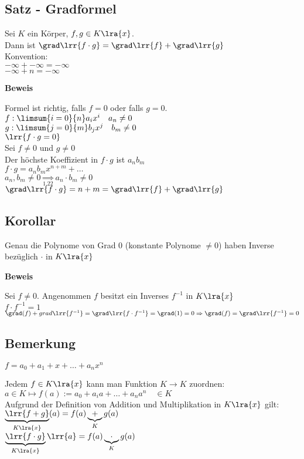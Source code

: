 \subsection{Satz - Gradformel}
	Sei $K$ ein Körper, $f,g\in K\lra{x}$.\\
	Dann ist $\grad\lrr{f\cdot g}=\grad\lrr{f}+\grad\lrr{g}$\\
	Konvention:\\
	$-\infty+-\infty=-\infty$\\
	$-\infty+n=-\infty$
	
	\textbf{Beweis}
	
	Formel ist richtig, falls $f=0$ oder falls $g=0$.\\
	$f:\limsum{i=0}{n}a_ix^i\quad a_n\neq 0$\\
	$g:\limsum{j=0}{m}b_jx^j\quad b_m\neq 0$\\
	$\lrr{f\cdot g = 0}$\\
	Sei $f\neq 0$ und $g\neq 0$\\
	Der höchste Koeffizient in $f\cdot g$ ist $a_nb_m$\\
	$f\cdot g=a_nb_mx^{n+m}+\dots$\\
	$a_n,b_m\neq 0\underset{1.22}{\Rightarrow}a_n\cdot b_m\neq 0$\\
	$\grad\lrr{f\cdot g}=n+m=\grad\lrr{f}+\grad\lrr{g}$
\subsection{Korollar}
	Genau die Polynome von Grad $0$ (konstante Polynome $\neq 0$) haben Inverse bezüglich $\cdot$ in $K\lra{x}$
	
	\textbf{Beweis}
	
	Sei $f\neq 0$. Angenommen $f$ besitzt ein Inverses $f^{-1}$ in $K\lra{x}$\\
	$f\cdot f^{-1} =1$\\
	$\grad(f)+grad\lrr{f^{-1}}=\grad\lrr{f\cdot f^{-1}}=\grad(1)=0\Rightarrow\grad(f)=\grad\lrr{f^{-1}}= 0$
\subsection{Bemerkung}
	$f=a_0+a_1+x+\dots+a_nx^n$
		\item Jedem $f\in K\lra{x}$ kann man Funktion $K\rightarrow K$ zuordnen:\\
			$a\in K\mapsto f(a):=a_0+a_ia+\dots+a_na^n\quad \in K$\\
			Aufgrund der Definition von Addition und Multiplikation in $K\lra{x}$ gilt:\\
			$\underbrace{\lrr{f+g}}_{K\lra{x}}(a)=f(a)\underbrace{+}_{K}g(a)$\\
			$\underbrace{\lrr{f\cdot g}}_{K\lra{x}}\lrr{a}=f(a)\underbrace{\cdot}_K g(a)$
			
